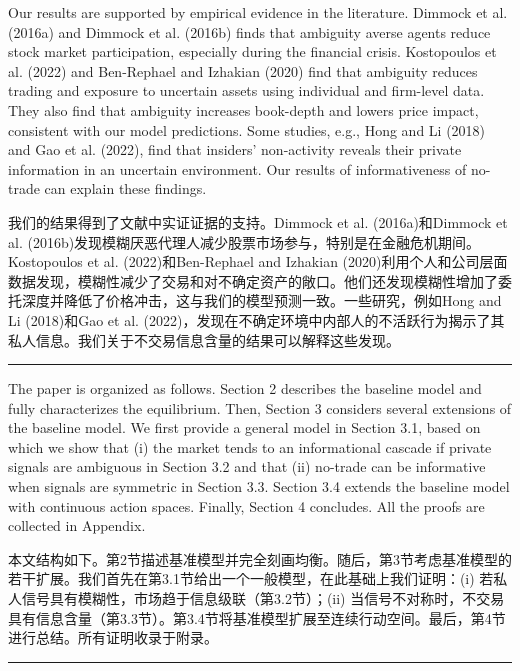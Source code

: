\documentclass[12pt,a4paper]{article}
\newenvironment{original}{%
  \par\vspace{4pt}\noindent%
  \color{black}%
  \ignorespaces
}{%
  \par\vspace{2pt}%
}
\newenvironment{translation}{%
  \par\vspace{2pt}\noindent%
  \color{transblue}%
  \ignorespaces
}{%
  \par\vspace{4pt}\hrule\vspace{6pt}%
}
\begin{document}
\begin{original}
Our results are supported by empirical evidence in the literature. Dimmock et al. (2016a) and Dimmock et al. (2016b) finds that ambiguity averse agents reduce stock market participation, especially during the financial crisis. Kostopoulos et al. (2022) and Ben-Rephael and Izhakian (2020) find that ambiguity reduces trading and exposure to uncertain assets using individual and firm-level data. They also find that ambiguity increases book-depth and lowers price impact, consistent with our model predictions. Some studies, e.g., Hong and Li (2018) and Gao et al. (2022), find that insiders' non-activity reveals their private information in an uncertain environment. Our results of informativeness of no-trade can explain these findings.
\end{original}
\begin{translation}
我们的结果得到了文献中实证证据的支持。Dimmock et al. (2016a)和Dimmock et al. (2016b)发现模糊厌恶代理人减少股票市场参与，特别是在金融危机期间。Kostopoulos et al. (2022)和Ben-Rephael and Izhakian (2020)利用个人和公司层面数据发现，模糊性减少了交易和对不确定资产的敞口。他们还发现模糊性增加了委托深度并降低了价格冲击，这与我们的模型预测一致。一些研究，例如Hong and Li (2018)和Gao et al. (2022)，发现在不确定环境中内部人的不活跃行为揭示了其私人信息。我们关于不交易信息含量的结果可以解释这些发现。
\end{translation}

\begin{original}
The paper is organized as follows. Section 2 describes the baseline model and fully characterizes the equilibrium. Then, Section 3 considers several extensions of the baseline model. We first provide a general model in Section 3.1, based on which we show that (i) the market tends to an informational cascade if private signals are ambiguous in Section 3.2 and that (ii) no-trade can be informative when signals are symmetric in Section 3.3. Section 3.4 extends the baseline model with continuous action spaces. Finally, Section 4 concludes. All the proofs are collected in Appendix.
\end{original}
\begin{translation}
本文结构如下。第2节描述基准模型并完全刻画均衡。随后，第3节考虑基准模型的若干扩展。我们首先在第3.1节给出一个一般模型，在此基础上我们证明：(i) 若私人信号具有模糊性，市场趋于信息级联（第3.2节）；(ii) 当信号不对称时，不交易具有信息含量（第3.3节）。第3.4节将基准模型扩展至连续行动空间。最后，第4节进行总结。所有证明收录于附录。
\end{translation}
\end{document}
